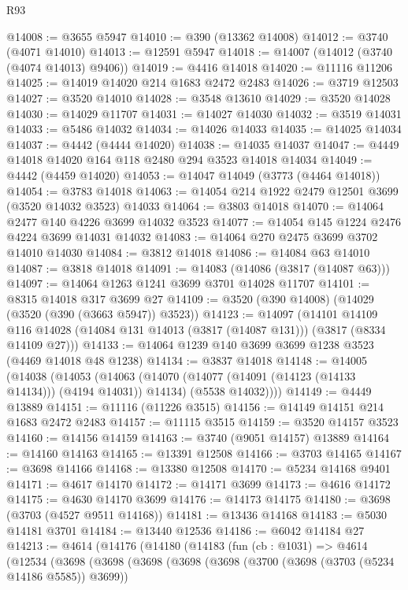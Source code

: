 \begin{lexlean}{R93}
\begin{coremodule}
@14008 := @3655 @5947
@14010 := @390 (@13362 @14008)
@14012 := @3740 (@4071 @14010)
@14013 := @12591 @5947
@14018 := @14007 (@14012 (@3740 (@4074 @14013) @9406))
@14019 := @4416 @14018
@14020 := @11116 @11206
@14025 := @14019 @14020 @214 @1683 @2472 @2483
@14026 := @3719 @12503
@14027 := @3520 @14010
@14028 := @3548 @13610
@14029 := @3520 @14028
@14030 := @14029 @11707
@14031 := @14027 @14030
@14032 := @3519 @14031
@14033 := @5486 @14032
@14034 := @14026 @14033
@14035 := @14025 @14034
@14037 := @4442 (@4444 @14020)
@14038 := @14035 @14037
@14047 := @4449 @14018 @14020 @164 @118 @2480 @294 @3523 @14018 @14034
@14049 := @4442 (@4459 @14020)
@14053 := @14047 @14049 (@3773 (@4464 @14018))
@14054 := @3783 @14018
@14063 := @14054 @214 @1922 @2479 @12501 @3699 (@3520 @14032 @3523) @14033
@14064 := @3803 @14018
@14070 := @14064 @2477 @140 @4226 @3699 @14032 @3523
@14077 := @14054 @145 @1224 @2476 @4224 @3699 @14031 @14032
@14083 := @14064 @270 @2475 @3699 @3702 @14010 @14030
@14084 := @3812 @14018
@14086 := @14084 @63 @14010
@14087 := @3818 @14018
@14091 := @14083 (@14086 (@3817 (@14087 @63)))
@14097 := @14064 @1263 @1241 @3699 @3701 @14028 @11707
@14101 := @8315 @14018 @317 @3699 @27
@14109 := @3520 (@390 @14008) (@14029 (@3520 (@390 (@3663 @5947)) @3523))
@14123 := @14097
    (@14101
      @14109
      @116
      @14028
      (@14084 @131 @14013 (@3817 (@14087 @131)))
      (@3817 (@8334 @14109 @27)))
@14133 := @14064 @1239 @140 @3699 @3699 @1238 @3523 (@4469 @14018 @48 @1238)
@14134 := @3837 @14018
@14148 := @14005
    (@14038
      (@14053
        (@14063
          (@14070 (@14077 (@14091 (@14123 (@14133 @14134))) (@4194 @14031)) @14134)
          (@5538 @14032))))
@14149 := @4449 @13889
@14151 := @11116 (@11226 @3515)
@14156 := @14149 @14151 @214 @1683 @2472 @2483
@14157 := @11115 @3515
@14159 := @3520 @14157 @3523
@14160 := @14156 @14159
@14163 := @3740 (@9051 @14157) @13889
@14164 := @14160 @14163
@14165 := @13391 @12508
@14166 := @3703 @14165
@14167 := @3698 @14166
@14168 := @13380 @12508
@14170 := @5234 @14168 @9401
@14171 := @4617 @14170
@14172 := @14171 @3699
@14173 := @4616 @14172
@14175 := @4630 @14170 @3699
@14176 := @14173 @14175
@14180 := @3698 (@3703 (@4527 @9511 @14168))
@14181 := @13436 @14168
@14183 := @5030 @14181 @3701
@14184 := @13440 @12536
@14186 := @6042 @14184 @27
@14213 := @4614
    (@14176
      (@14180
        (@14183
          (fun (cb : @1031) =>
          @4614
            (@12534
              (@3698
                (@3698
                  (@3698
                    (@3698
                      (@3698
                        (@3700 (@3698 (@3703 (@5234 @14186 @5585)) @3699))

\end{coremodule}
\end{lexlean}
